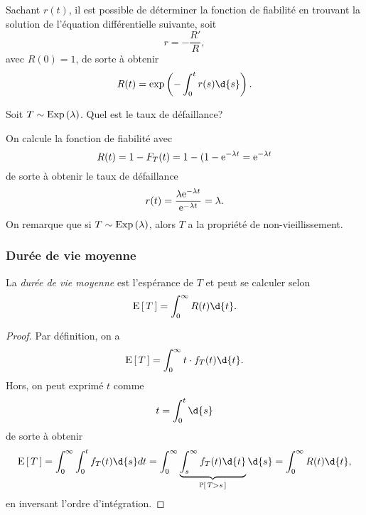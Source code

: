 \documentclass[11pt]{article}
\renewcommand\P[1]{%
	\ensuremath{%
		\mathbb{P}\left[\,#1\,\right]%
	}%
}%
\newcommand\e{%
	\ensuremath{%
		\mathrm{e}%
	}%
}%
\newcommand\Exp[1]{%
	\ensuremath{%
		\mathrm{Exp}\left(#1\right)%
	}%
}%
\newcommand\Esp[1]{%
	\ensuremath{%
		\mathrm{E}\left[\,#1\,\right]%
	}%
}%
\begin{document}
Sachant $r(t)$, il est possible de déterminer la fonction de fiabilité en
trouvant la solution de l'équation différentielle suivante, soit
\begin{equation*}
	r=-\frac{R\prime}{R},
\end{equation*}
avec $R(0)=1$, de sorte à obtenir
\begin{equation*}
	R(t)=\exp\left(-\int_0^tr(s)\d{s}\right).
\end{equation*}

\pagebreak
\begin{exemple}
	Soit $T\sim\Exp{\lambda}$. Quel est le taux de défaillance?

	On calcule la fonction de fiabilité avec
	\begin{equation*}
		R(t)
		=1-F_T(t)
		=1-(1-\e^{-\lambda t}
		=\e^{-\lambda t}
	\end{equation*}
	de sorte à obtenir le taux de défaillance
	\begin{equation*}
		r(t)
		=\frac{\lambda\e^{-\lambda t}}{\e^{-\lambda t}}
		=\lambda.
	\end{equation*}
	On remarque que si $T\sim\Exp{\lambda}$, alors $T$ a la propriété de
	non-vieillissement.
\end{exemple}

\subsubsection{Durée de vie moyenne}
La \textit{durée de vie moyenne} est l'espérance de $T$ et peut se calculer
selon
\begin{equation*}
	\Esp{T}=\int_0^\infty R(t)\d{t}.
\end{equation*}

\begin{proof}
	Par définition, on a
	\begin{equation*}
		\Esp{T}=\int_0^\infty t\cdot f_T(t)\d{t}.
	\end{equation*}
	Hors, on peut exprimé $t$ comme
	\begin{equation*}
		t=\int_0^t\d{s}
	\end{equation*}
	de sorte à obtenir
	\begin{equation*}
		\Esp{T}
		=\int_0^\infty\int_0^t f_T(t)\d{s}d{t}
		=\int_0^\infty\underbrace{\int_s^\infty f_T(t)\d{t}}_{\P{T>s}}\d{s}
		=\int_0^\infty R(t)\d{t},
	\end{equation*}
	en inversant l'ordre d'intégration.
\end{proof}
\end{document}
